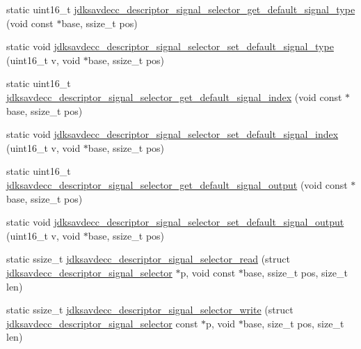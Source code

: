 \begin{DoxyCompactItemize}
\item 
static uint16\+\_\+t \hyperlink{group__descriptor__signal__selector_ga59de783027369f5d6090744afc83d0cc}{jdksavdecc\+\_\+descriptor\+\_\+signal\+\_\+selector\+\_\+get\+\_\+default\+\_\+signal\+\_\+type} (void const $\ast$base, ssize\+\_\+t pos)
\item 
static void \hyperlink{group__descriptor__signal__selector_ga955082c62bbac4382f693f7f58dba39f}{jdksavdecc\+\_\+descriptor\+\_\+signal\+\_\+selector\+\_\+set\+\_\+default\+\_\+signal\+\_\+type} (uint16\+\_\+t v, void $\ast$base, ssize\+\_\+t pos)
\item 
static uint16\+\_\+t \hyperlink{group__descriptor__signal__selector_gaec1150cecac330db769ac93f28b7f111}{jdksavdecc\+\_\+descriptor\+\_\+signal\+\_\+selector\+\_\+get\+\_\+default\+\_\+signal\+\_\+index} (void const $\ast$base, ssize\+\_\+t pos)
\item 
static void \hyperlink{group__descriptor__signal__selector_gaaf90c06e5370018a979cd955de5101e7}{jdksavdecc\+\_\+descriptor\+\_\+signal\+\_\+selector\+\_\+set\+\_\+default\+\_\+signal\+\_\+index} (uint16\+\_\+t v, void $\ast$base, ssize\+\_\+t pos)
\item 
static uint16\+\_\+t \hyperlink{group__descriptor__signal__selector_gafb6b6953b03fce581a01638243f4ec42}{jdksavdecc\+\_\+descriptor\+\_\+signal\+\_\+selector\+\_\+get\+\_\+default\+\_\+signal\+\_\+output} (void const $\ast$base, ssize\+\_\+t pos)
\item 
static void \hyperlink{group__descriptor__signal__selector_ga261d73b5ac13d7c610e2ef5004dc8951}{jdksavdecc\+\_\+descriptor\+\_\+signal\+\_\+selector\+\_\+set\+\_\+default\+\_\+signal\+\_\+output} (uint16\+\_\+t v, void $\ast$base, ssize\+\_\+t pos)
\item 
static ssize\+\_\+t \hyperlink{group__descriptor__signal__selector_gaf69da9e98110061ff566f5d3b7173d9a}{jdksavdecc\+\_\+descriptor\+\_\+signal\+\_\+selector\+\_\+read} (struct \hyperlink{structjdksavdecc__descriptor__signal__selector}{jdksavdecc\+\_\+descriptor\+\_\+signal\+\_\+selector} $\ast$p, void const $\ast$base, ssize\+\_\+t pos, size\+\_\+t len)
\item 
static ssize\+\_\+t \hyperlink{group__descriptor__signal__selector_gaf0cdb035cbad116f2e677246fe2ae2b0}{jdksavdecc\+\_\+descriptor\+\_\+signal\+\_\+selector\+\_\+write} (struct \hyperlink{structjdksavdecc__descriptor__signal__selector}{jdksavdecc\+\_\+descriptor\+\_\+signal\+\_\+selector} const $\ast$p, void $\ast$base, size\+\_\+t pos, size\+\_\+t len)
\end{DoxyCompactItemize}



